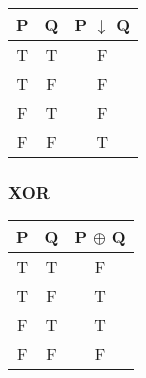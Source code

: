 \begin{multicols}{2}
\begin{table}[H]
\centering
\begin{tabular}[t]{|c|c|c|}
\hline
\textbf{P} & \textbf{Q} & \textbf{P $\downarrow$ Q} \\ \hline
T & T & F \\ \hline
T & F & F \\ \hline
F & T & F \\ \hline
F & F & T \\ \hline
\end{tabular}
\end{table}

\subsubsection{XOR}

\begin{table}[H]
\centering
\begin{tabular}[t]{|c|c|c|}
\hline
\textbf{P} & \textbf{Q} & \textbf{P $\oplus$ Q} \\ \hline
T & T & F \\ \hline
T & F & T \\ \hline
F & T & T \\ \hline
F & F & F \\ \hline
\end{tabular}
\end{table}

\end{multicols}
